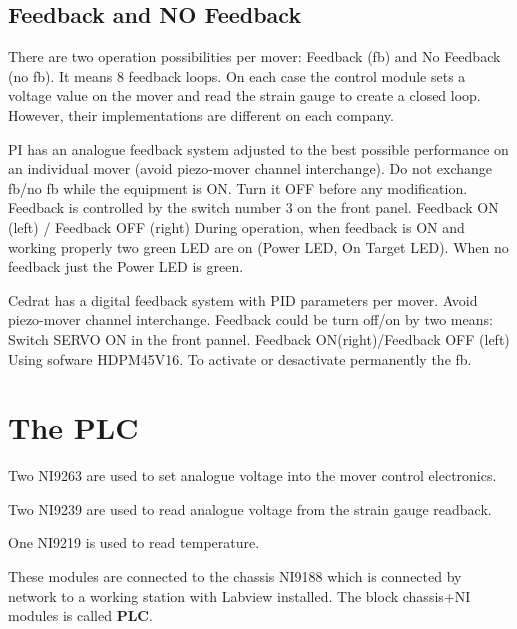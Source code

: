 \documentclass[a4paper,11pt]{book}
\begin{document}
\subsection{Feedback and NO Feedback}
There are two operation possibilities per mover: Feedback (fb) and No Feedback (no fb). It means 8 feedback loops. On each case the control module sets a voltage value on the mover and read the strain gauge to create a closed loop. However, their implementations are different on each company.

PI has an analogue feedback system adjusted to the best possible performance on an individual mover (avoid piezo-mover channel interchange). Do not exchange fb/no fb while the equipment is ON. Turn it OFF before any modification. 
Feedback is controlled by the switch number 3  on the front panel. 
Feedback ON (left) / Feedback OFF (right)
During operation, when feedback is ON and working properly two green LED are on (Power LED, On Target LED). When no feedback just the Power LED is green.

Cedrat has a digital feedback system with PID parameters per mover. Avoid piezo-mover channel interchange. Feedback could be turn off/on by two means:
Switch SERVO ON in the front pannel. Feedback ON(right)/Feedback OFF (left)
Using sofware  HDPM45V16. To activate or desactivate permanently the fb.

\section{The PLC}
Two NI9263 are used to set analogue voltage into the mover control electronics.\par
Two NI9239 are used to read analogue voltage from the strain gauge readback.\par
One NI9219 is used to read temperature.\par
These modules are connected to the chassis NI9188 which is connected by network to a working station with Labview installed.
The block chassis+NI modules is called \textbf{PLC}.\par
\end{document}
